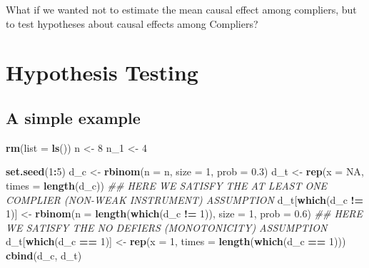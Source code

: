 \documentclass[12pt,leqno]{article}
\newenvironment{Shaded}{\begin{snugshade}}{\end{snugshade}}
\newcommand{\CommentTok}[1]{\textcolor[rgb]{0.56,0.35,0.01}{\textit{#1}}}
\newcommand{\DataTypeTok}[1]{\textcolor[rgb]{0.13,0.29,0.53}{#1}}
\newcommand{\DecValTok}[1]{\textcolor[rgb]{0.00,0.00,0.81}{#1}}
\newcommand{\FloatTok}[1]{\textcolor[rgb]{0.00,0.00,0.81}{#1}}
\newcommand{\KeywordTok}[1]{\textcolor[rgb]{0.13,0.29,0.53}{\textbf{#1}}}
\newcommand{\NormalTok}[1]{#1}
\newcommand{\OperatorTok}[1]{\textcolor[rgb]{0.81,0.36,0.00}{\textbf{#1}}}
\newcommand{\OtherTok}[1]{\textcolor[rgb]{0.56,0.35,0.01}{#1}}
\newcommand{\StringTok}[1]{\textcolor[rgb]{0.31,0.60,0.02}{#1}}
\theoremstyle{newstyle}
\begin{document}
What if we wanted not to estimate the mean causal effect among
compliers, but to test hypotheses about causal effects among Compliers?

\hypertarget{hypothesis-testing}{%
\section{Hypothesis Testing}\label{hypothesis-testing}}

\hypertarget{a-simple-example}{%
\subsection{A simple example}\label{a-simple-example}}

\begin{Shaded}
\begin{Highlighting}[]
\KeywordTok{rm}\NormalTok{(}\DataTypeTok{list =} \KeywordTok{ls}\NormalTok{())}
\NormalTok{n \textless{}{-}}\StringTok{ }\DecValTok{8}
\NormalTok{n\_}\DecValTok{1}\NormalTok{ \textless{}{-}}\StringTok{ }\DecValTok{4}

\KeywordTok{set.seed}\NormalTok{(}\DecValTok{1}\OperatorTok{:}\DecValTok{5}\NormalTok{)}
\NormalTok{d\_c \textless{}{-}}\StringTok{ }\KeywordTok{rbinom}\NormalTok{(}\DataTypeTok{n =}\NormalTok{ n, }\DataTypeTok{size =} \DecValTok{1}\NormalTok{, }\DataTypeTok{prob =} \FloatTok{0.3}\NormalTok{)}
\NormalTok{d\_t \textless{}{-}}\StringTok{ }\KeywordTok{rep}\NormalTok{(}\DataTypeTok{x =} \OtherTok{NA}\NormalTok{, }\DataTypeTok{times =} \KeywordTok{length}\NormalTok{(d\_c))}
\CommentTok{\#\# HERE WE SATISFY THE AT LEAST ONE COMPLIER (NON{-}WEAK INSTRUMENT) ASSUMPTION}
\NormalTok{d\_t[}\KeywordTok{which}\NormalTok{(d\_c }\OperatorTok{!=}\StringTok{ }\DecValTok{1}\NormalTok{)] \textless{}{-}}\StringTok{ }\KeywordTok{rbinom}\NormalTok{(}\DataTypeTok{n =} \KeywordTok{length}\NormalTok{(}\KeywordTok{which}\NormalTok{(d\_c }\OperatorTok{!=}\StringTok{ }\DecValTok{1}\NormalTok{)), }\DataTypeTok{size =} \DecValTok{1}\NormalTok{, }\DataTypeTok{prob =} \FloatTok{0.6}\NormalTok{)}
\CommentTok{\#\# HERE WE SATISFY THE NO DEFIERS (MONOTONICITY) ASSUMPTION}
\NormalTok{d\_t[}\KeywordTok{which}\NormalTok{(d\_c }\OperatorTok{==}\StringTok{ }\DecValTok{1}\NormalTok{)] \textless{}{-}}\StringTok{ }\KeywordTok{rep}\NormalTok{(}\DataTypeTok{x =} \DecValTok{1}\NormalTok{, }\DataTypeTok{times =} \KeywordTok{length}\NormalTok{(}\KeywordTok{which}\NormalTok{(d\_c }\OperatorTok{==}\StringTok{ }\DecValTok{1}\NormalTok{)))}
\KeywordTok{cbind}\NormalTok{(d\_c, d\_t)}
\end{Highlighting}
\end{Shaded}
\end{document}
